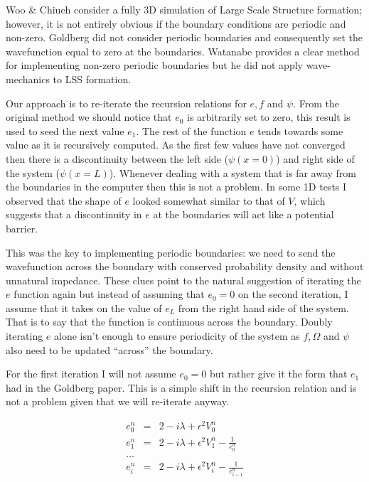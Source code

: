 Woo \& Chiueh \citep{bib_wooc} consider a fully 3D simulation of Large Scale Structure formation; however, it is not entirely obvious if the boundary conditions are periodic and non-zero. Goldberg \citep{bib_gold} did not consider periodic boundaries and consequently set the wavefunction equal to zero at the boundaries. Watanabe \citep{bib_wat} provides a clear method for implementing non-zero periodic boundaries but he did not apply wave-mechanics to LSS formation.

Our approach is to re-iterate the recursion relations for $e,f$ and $\psi$. From the original method we should notice that $e_0$ is arbitrarily set to zero, this result is used to seed the next value $e_1$. The rest of the function $e$ tends towards some value as it is recursively computed. As the first few values have not converged then there is a discontinuity between the left side ($\psi(x=0)$) and right side of the system ($\psi(x=L)$). Whenever dealing with a system that is far away from the boundaries in the computer then this is not a problem. In some 1D tests I observed that the shape of $e$ looked somewhat similar to that of $V$, which suggests that a discontinuity in $e$ at the boundaries will act like a potential barrier.

This was the key to implementing periodic boundaries: we need to send the wavefunction across the boundary with conserved probability density and without unnatural impedance. These clues point to the natural suggestion of iterating the $e$ function again but instead of assuming that $e_0 = 0$ on the second iteration, I assume that it takes on the value of $e_L$ from the right hand side of the system. That is to say that the function is continuous across the boundary. Doubly iterating $e$ alone isn't enough to ensure periodicity of the system as $f, \Omega$ and $\psi$ also need to be updated ``across'' the boundary.

For the first iteration I will not assume $e_0 = 0$ but rather give it the form that $e_1$ had in the Goldberg paper. This is a simple shift in the recursion relation and is not a problem given that we will re-iterate anyway.

\begin{eqnarray}
e_{0}^n &=& 2 -i\lambda +\epsilon^2 V_{0}^{n} \nonumber \\
e_{1}^n &=& 2 -i\lambda +\epsilon^2 V_{1}^{n} - \frac{1}{e_{0}^n} \nonumber \\
\ldots \nonumber \\
e_{i}^n &=& 2 -i\lambda +\epsilon^2 V_{i}^{n} - \frac{1}{e_{i-1}^n}
\end{eqnarray}

